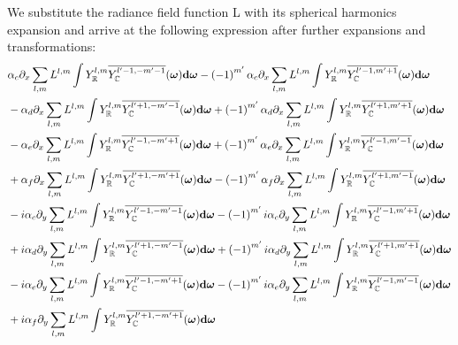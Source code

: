 We substitute the radiance field function L with its spherical harmonics expansion and arrive
at the following expression after further expansions and transformations:
\begin{align*}
&
\alpha_c\partial_x\sum_{l,m}L^{l,m}\int{\SHBR^{l,m}\overline{Y_{\mathbb{C}}^{l'-1, -m'-1}}(\vec{\omega} )\mathbf{d}\vec{\omega}}
-\left({-1}\right)^{m'}\alpha_c\partial_x\sum_{l,m}L^{l,m}\int{\SHBR^{l,m}\overline{Y_{\mathbb{C}}^{l'-1, m'+1}}(\vec{\omega} )\mathbf{d}\vec{\omega}}
\\&
-\alpha_d\partial_x\sum_{l,m}L^{l,m}\int{\SHBR^{l,m}\overline{Y_{\mathbb{C}}^{l'+1, -m'-1}}(\vec{\omega} )\mathbf{d}\vec{\omega}}
+\left({-1}\right)^{m'}\alpha_d\partial_x\sum_{l,m}L^{l,m}\int{\SHBR^{l,m}\overline{Y_{\mathbb{C}}^{l'+1, m'+1}}(\vec{\omega} )\mathbf{d}\vec{\omega}}
\\&
-\alpha_e\partial_x\sum_{l,m}L^{l,m}\int{\SHBR^{l,m}\overline{Y_{\mathbb{C}}^{l'-1, -m'+1}}(\vec{\omega} )\mathbf{d}\vec{\omega}}
+\left({-1}\right)^{m'}\alpha_e\partial_x\sum_{l,m}L^{l,m}\int{\SHBR^{l,m}\overline{Y_{\mathbb{C}}^{l'-1, m'-1}}(\vec{\omega} )\mathbf{d}\vec{\omega}}
\\&
+\alpha_f\partial_x\sum_{l,m}L^{l,m}\int{\SHBR^{l,m}\overline{Y_{\mathbb{C}}^{l'+1, -m'+1}}(\vec{\omega} )\mathbf{d}\vec{\omega}}
-\left({-1}\right)^{m'}\alpha_f\partial_x\sum_{l,m}L^{l,m}\int{\SHBR^{l,m}\overline{Y_{\mathbb{C}}^{l'+1, m'-1}}(\vec{\omega} )\mathbf{d}\vec{\omega}}
\\&
-i \alpha_c\partial_y\sum_{l,m}L^{l,m}\int{\SHBR^{l,m}\overline{Y_{\mathbb{C}}^{l'-1, -m'-1}}(\vec{\omega} )\mathbf{d}\vec{\omega}}
-\left({-1}\right)^{m'}i \alpha_c\partial_y\sum_{l,m}L^{l,m}\int{\SHBR^{l,m}\overline{Y_{\mathbb{C}}^{l'-1, m'+1}}(\vec{\omega} )\mathbf{d}\vec{\omega}}
\\&
+i \alpha_d\partial_y\sum_{l,m}L^{l,m}\int{\SHBR^{l,m}\overline{Y_{\mathbb{C}}^{l'+1, -m'-1}}(\vec{\omega} )\mathbf{d}\vec{\omega}}
+\left({-1}\right)^{m'}i \alpha_d\partial_y\sum_{l,m}L^{l,m}\int{\SHBR^{l,m}\overline{Y_{\mathbb{C}}^{l'+1, m'+1}}(\vec{\omega} )\mathbf{d}\vec{\omega}}
\\&
-i \alpha_e\partial_y\sum_{l,m}L^{l,m}\int{\SHBR^{l,m}\overline{Y_{\mathbb{C}}^{l'-1, -m'+1}}(\vec{\omega} )\mathbf{d}\vec{\omega}}
-\left({-1}\right)^{m'}i \alpha_e\partial_y\sum_{l,m}L^{l,m}\int{\SHBR^{l,m}\overline{Y_{\mathbb{C}}^{l'-1, m'-1}}(\vec{\omega} )\mathbf{d}\vec{\omega}}
\\&
+i \alpha_f\partial_y\sum_{l,m}L^{l,m}\int{\SHBR^{l,m}\overline{Y_{\mathbb{C}}^{l'+1, -m'+1}}(\vec{\omega} )\mathbf{d}\vec{\omega}}

\end{align*}
